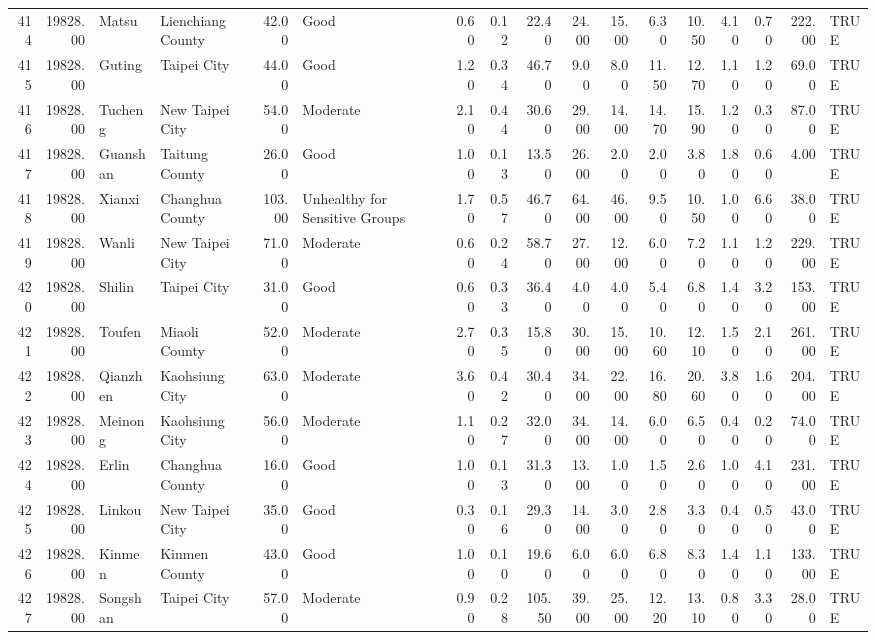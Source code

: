 \begin{table}[ht]
\begin{tabular}{rrllrlrrrrrrrrrrl}
  414 & 19828.00 & Matsu & Lienchiang County & 42.00 & Good & 0.60 & 0.12 & 22.40 & 24.00 & 15.00 & 6.30 & 10.50 & 4.10 & 0.70 & 222.00 & TRUE \\ 
  415 & 19828.00 & Guting & Taipei City & 44.00 & Good & 1.20 & 0.34 & 46.70 & 9.00 & 8.00 & 11.50 & 12.70 & 1.10 & 1.20 & 69.00 & TRUE \\ 
  416 & 19828.00 & Tucheng & New Taipei City & 54.00 & Moderate & 2.10 & 0.44 & 30.60 & 29.00 & 14.00 & 14.70 & 15.90 & 1.20 & 0.30 & 87.00 & TRUE \\ 
  417 & 19828.00 & Guanshan & Taitung County & 26.00 & Good & 1.00 & 0.13 & 13.50 & 26.00 & 2.00 & 2.00 & 3.80 & 1.80 & 0.60 & 4.00 & TRUE \\ 
  418 & 19828.00 & Xianxi & Changhua County & 103.00 & Unhealthy for Sensitive Groups & 1.70 & 0.57 & 46.70 & 64.00 & 46.00 & 9.50 & 10.50 & 1.00 & 6.60 & 38.00 & TRUE \\ 
  419 & 19828.00 & Wanli & New Taipei City & 71.00 & Moderate & 0.60 & 0.24 & 58.70 & 27.00 & 12.00 & 6.00 & 7.20 & 1.10 & 1.20 & 229.00 & TRUE \\ 
  420 & 19828.00 & Shilin & Taipei City & 31.00 & Good & 0.60 & 0.33 & 36.40 & 4.00 & 4.00 & 5.40 & 6.80 & 1.40 & 3.20 & 153.00 & TRUE \\ 
  421 & 19828.00 & Toufen & Miaoli County & 52.00 & Moderate & 2.70 & 0.35 & 15.80 & 30.00 & 15.00 & 10.60 & 12.10 & 1.50 & 2.10 & 261.00 & TRUE \\ 
  422 & 19828.00 & Qianzhen & Kaohsiung City & 63.00 & Moderate & 3.60 & 0.42 & 30.40 & 34.00 & 22.00 & 16.80 & 20.60 & 3.80 & 1.60 & 204.00 & TRUE \\ 
  423 & 19828.00 & Meinong & Kaohsiung City & 56.00 & Moderate & 1.10 & 0.27 & 32.00 & 34.00 & 14.00 & 6.00 & 6.50 & 0.40 & 0.20 & 74.00 & TRUE \\ 
  424 & 19828.00 & Erlin & Changhua County & 16.00 & Good & 1.00 & 0.13 & 31.30 & 13.00 & 1.00 & 1.50 & 2.60 & 1.00 & 4.10 & 231.00 & TRUE \\ 
  425 & 19828.00 & Linkou & New Taipei City & 35.00 & Good & 0.30 & 0.16 & 29.30 & 14.00 & 3.00 & 2.80 & 3.30 & 0.40 & 0.50 & 43.00 & TRUE \\ 
  426 & 19828.00 & Kinmen & Kinmen County & 43.00 & Good & 1.00 & 0.10 & 19.60 & 6.00 & 6.00 & 6.80 & 8.30 & 1.40 & 1.10 & 133.00 & TRUE \\ 
  427 & 19828.00 & Songshan & Taipei City & 57.00 & Moderate & 0.90 & 0.28 & 105.50 & 39.00 & 25.00 & 12.20 & 13.10 & 0.80 & 3.30 & 28.00 & TRUE \\ 

\end{tabular}
\end{table}
